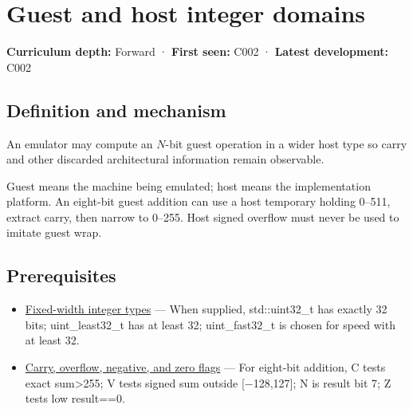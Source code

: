 \hypertarget{appendix-33e7a011b684}{}\label{referencestart:appendix-33e7a011b684}
\section{Guest and host integer domains}\label{appendix-33e7a011b684-guest-and-host-integer-domains}

\hypertarget{appendix-33e7a011b684-guest-and-host-integer-domains}{}

\textbf{Curriculum depth:} Forward · \textbf{First seen:} C002 · \textbf{Latest development:} C002

\begin{allmightroledefinition}

\subsection{Definition and mechanism}\label{appendix-33e7a011b684-definition-and-mechanism}

\hypertarget{appendix-33e7a011b684-definition-and-mechanism}{}

An emulator may compute an \(N\)-bit guest operation in a wider host type so carry and other discarded architectural information remain observable.

\end{allmightroledefinition}

Guest means the machine being emulated; host means the implementation platform. An eight-bit guest addition can use a host temporary holding 0--511, extract carry, then narrow to 0--255. Host signed overflow must never be used to imitate guest wrap.

\subsection{Prerequisites}\label{appendix-33e7a011b684-prerequisites}

\hypertarget{appendix-33e7a011b684-prerequisites}{}

\begin{itemize}
\tightlist
\item
  \hyperref[appendix-cc04044b5782]{Fixed-width integer types} --- When supplied, std::uint32\_t has exactly 32 bits; uint\_least32\_t has at least 32; uint\_fast32\_t is chosen for speed with at least 32.
\item
  \hyperref[appendix-8d687c9c08ab]{Carry, overflow, negative, and zero flags} --- For eight-bit addition, C tests exact sum\textgreater255; V tests signed sum outside {[}−128,127{]}; N is result bit 7; Z tests low result==0.
\end{itemize}

